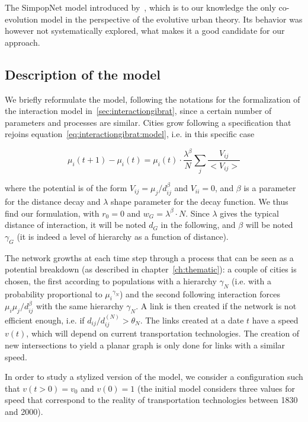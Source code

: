 The SimpopNet model introduced by~\cite{schmitt2014modelisation}, which is to our knowledge the only co-evolution model in the perspective of the evolutive urban theory. Its behavior was however not systematically explored, what makes it a good candidate for our approach.



\subsection{Description of the model}


We briefly reformulate the model, following the notations for the formalization of the interaction model in~\ref{sec:interactiongibrat}, since a certain number of parameters and processes are similar. Cities grow following a specification that rejoins equation~\ref{eq:interactiongibrat:model}, i.e. in this specific case

\[
\mu_i(t+1) - \mu_i (t) = \mu_i (t) \cdot \frac{\lambda^{\beta}}{N} \sum_{j} \frac{V_{ij}}{<V_{ij}>}
\]

where the potential is of the form $V_{ij} = \mu_j / d_{ij}^\beta$ and $V_{ii}=0$, and $\beta$ is a parameter for the distance decay and $\lambda$ shape parameter for the decay function. We thus find our formulation, with $r_0 = 0$ and $w_G = \lambda^\beta \cdot N$. Since $\lambda$ gives the typical distance of interaction, it will be noted $d_G$ in the following, and $\beta$ will be noted $\gamma_G$ (it is indeed a level of hierarchy as a function of distance).

The network growths at each time step through a process that can be seen as a potential breakdown (as described in chapter~\ref{ch:thematic}): a couple of cities is chosen, the first according to populations with a hierarchy $\gamma_N$ (i.e. with a probability proportional to ${\mu_i}^{\gamma_N}$) and the second following interaction forces $\mu_i \mu_j / d_{ij}^\beta$ with the same hierarchy $\gamma_N$. A link is then created if the network is not efficient enough, i.e. if $d_{ij}/d^{(N)}_{ij}> \theta_N$. The links created at a date $t$ have a speed $v(t)$, which will depend on current transportation technologies. The creation of new intersections to yield a planar graph is only done for links with a similar speed.

In order to study a stylized version of the model, we consider a configuration such that $v(t > 0) = v_0$ and $v(0) = 1$ (the initial model considers three values for speed that correspond to the reality of transportation technologies between 1830 and 2000).


